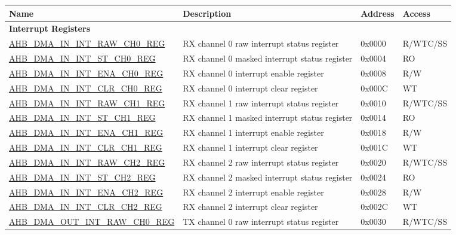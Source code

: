 \begin{longtable}{ | p{8cm} | p{8cm} | p{1.3cm} | p{1.5cm} | }
\hline\rowcolor{lightgray}
\textbf{Name} & \textbf{Description} &  \textbf{Address} & \textbf{Access} \\ \hline
\endhead
\multicolumn{4}{|l|}{\textbf{Interrupt Registers}} \\ \hline
\hyperref[regdesc:AHBDMAININTRAWCHNREG]{AHB\_DMA\_IN\_INT\_RAW\_CH0\_REG} & RX channel 0 raw interrupt status register & 0x0000 & R/WTC/SS \\ \hline
\hyperref[regdesc:AHBDMAININTSTCHNREG]{AHB\_DMA\_IN\_INT\_ST\_CH0\_REG} & RX channel 0 masked interrupt status register & 0x0004 & RO \\ \hline
\hyperref[regdesc:AHBDMAININTENACHNREG]{AHB\_DMA\_IN\_INT\_ENA\_CH0\_REG} & RX channel 0 interrupt enable register & 0x0008 & R/W \\ \hline
\hyperref[regdesc:AHBDMAININTCLRCHNREG]{AHB\_DMA\_IN\_INT\_CLR\_CH0\_REG} & RX channel 0 interrupt clear register & 0x000C & WT \\ \hline
\hyperref[regdesc:AHBDMAININTRAWCHNREG]{AHB\_DMA\_IN\_INT\_RAW\_CH1\_REG} & RX channel 1 raw interrupt status register & 0x0010 & R/WTC/SS \\ \hline
\hyperref[regdesc:AHBDMAININTSTCHNREG]{AHB\_DMA\_IN\_INT\_ST\_CH1\_REG} & RX channel 1 masked interrupt status register & 0x0014 & RO \\ \hline
\hyperref[regdesc:AHBDMAININTENACHNREG]{AHB\_DMA\_IN\_INT\_ENA\_CH1\_REG} & RX channel 1 interrupt enable register & 0x0018 & R/W \\ \hline
\hyperref[regdesc:AHBDMAININTCLRCHNREG]{AHB\_DMA\_IN\_INT\_CLR\_CH1\_REG} & RX channel 1 interrupt clear register & 0x001C & WT \\ \hline
\hyperref[regdesc:AHBDMAININTRAWCHNREG]{AHB\_DMA\_IN\_INT\_RAW\_CH2\_REG} & RX channel 2 raw interrupt status register & 0x0020 & R/WTC/SS \\ \hline
\hyperref[regdesc:AHBDMAININTSTCHNREG]{AHB\_DMA\_IN\_INT\_ST\_CH2\_REG} & RX channel 2 masked interrupt status register & 0x0024 & RO \\ \hline
\hyperref[regdesc:AHBDMAININTENACHNREG]{AHB\_DMA\_IN\_INT\_ENA\_CH2\_REG} & RX channel 2 interrupt enable register & 0x0028 & R/W \\ \hline
\hyperref[regdesc:AHBDMAININTCLRCHNREG]{AHB\_DMA\_IN\_INT\_CLR\_CH2\_REG} & RX channel 2 interrupt clear register & 0x002C & WT \\ \hline
\hyperref[regdesc:AHBDMAOUTINTRAWCHNREG]{AHB\_DMA\_OUT\_INT\_RAW\_CH0\_REG} & TX channel 0 raw interrupt status register & 0x0030 & R/WTC/SS \\ \hline

\end{longtable}
